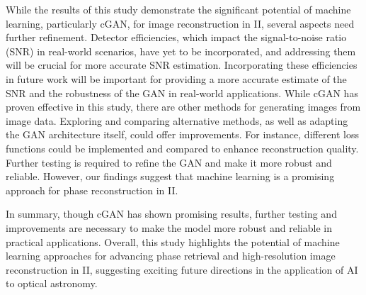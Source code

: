 While the results of this study demonstrate the significant potential of machine learning, particularly cGAN, for image reconstruction in II, several aspects need further refinement. Detector efficiencies, which impact the signal-to-noise ratio (SNR) in real-world scenarios, have yet to be incorporated, and addressing them will be crucial for more accurate SNR estimation. Incorporating these efficiencies in future work will be important for providing a more accurate estimate of the SNR and the robustness of the GAN in real-world applications. While cGAN has proven effective in this study, there are other methods for generating images from image data. Exploring and comparing alternative methods, as well as adapting the GAN architecture itself, could offer improvements. For instance, different loss functions could be implemented and compared to enhance reconstruction quality. Further testing is required to refine the GAN and make it more robust and reliable. However, our findings suggest that machine learning is a promising approach for phase reconstruction in II.

In summary, though cGAN has shown promising results, further testing and improvements are necessary to make the model more robust and reliable in practical applications. Overall, this study highlights the potential of machine learning approaches for advancing phase retrieval and high-resolution image reconstruction in II, suggesting exciting future directions in the application of AI to optical astronomy.